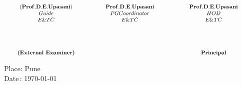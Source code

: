 \documentclass[a4paper,12pt]{report}
\def\guide{Prof. D. E. Upasani}
\def\pgco{Prof. D. E. Upasani}
\def\hod{Prof. D. E. Upasani}
\begin{document}
\begin{center}

\footnotesize
$$
\begin{array}{c c c}
\hspace{5cm} \hfil	& \hspace{5cm} \hfil	&\hspace{5cm} \hfil\\
\bf(\guide) 	&  \bf \pgco	&\bf \hod \\
Guide 		& PG Coordinator& HOD	\\
E\&TC		& E\&TC		&E\&TC \\
\\
\\
\\
\\
\textbf{(External Examiner)} & &\textbf{Principal}\\
\end{array}
$$
\end{center}



\vspace{1cm}
\begin{flushleft}
 Place: Pune \\
 Date\,: \today
\end{flushleft}
\clearpage
\restoregeometry

\end{document}
